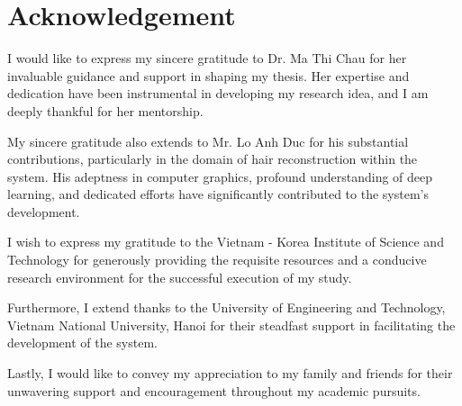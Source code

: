 \section*{Acknowledgement}
\label{sec:acknowledgement}

I would like to express my sincere gratitude to Dr. Ma Thi Chau for her invaluable guidance and support in shaping my thesis. Her expertise and dedication have been instrumental in developing my research idea, and I am deeply thankful for her mentorship.

My sincere gratitude also extends to Mr. Lo Anh Duc for his substantial contributions, particularly in the domain of hair reconstruction within the system. His adeptness in computer graphics, profound understanding of deep learning, and dedicated efforts have significantly contributed to the system's development.

I wish to express my gratitude to the Vietnam - Korea Institute of Science and Technology for generously providing the requisite resources and a conducive research environment for the successful execution of my study.

Furthermore, I extend thanks to the University of Engineering and Technology, Vietnam National University, Hanoi for their steadfast support in facilitating the development of the system.

Lastly, I would like to convey my appreciation to my family and friends for their unwavering support and encouragement throughout my academic pursuits.
